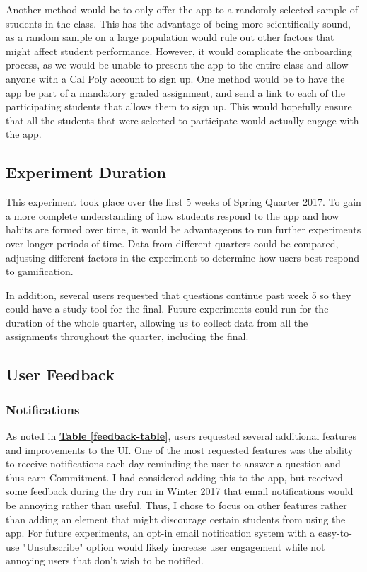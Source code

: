 \par Another method would be to only offer the app to a randomly selected sample of students in the class. This has the advantage of being more scientifically sound, as a random sample on a large population would rule out other factors that might affect student performance. However, it would complicate the onboarding process, as we would be unable to present the app to the entire class and allow anyone with a Cal Poly account to sign up. One method would be to have the app be part of a mandatory graded assignment, and send a link to each of the participating students that allows them to sign up. This would hopefully ensure that all the students that were selected to participate would actually engage with the app.

\subsection{Experiment Duration}

\par This experiment took place over the first 5 weeks of Spring Quarter 2017. To gain a more complete understanding of how students respond to the app and how habits are formed over time, it would be advantageous to run further experiments over longer periods of time. Data from different quarters could be compared, adjusting different factors in the experiment to determine how users best respond to gamification. 

\par In addition, several users requested that questions continue past week 5 so they could have a study tool for the final. Future experiments could run for the duration of the whole quarter, allowing us to collect data from all the assignments throughout the quarter, including the final.

\subsection{User Feedback}

\subsubsection{Notifications}

\par As noted in \textbf{\hyperref[feedback-table]{Table \ref*{feedback-table}}}, users requested several additional features and improvements to the UI. One of the most requested features was the ability to receive notifications each day reminding the user to answer a question and thus earn Commitment. I had considered adding this to the app, but received some feedback during the dry run in Winter 2017 that email notifications would be annoying rather than useful. Thus, I chose to focus on other features rather than adding an element that might discourage certain students from using the app. For future experiments, an opt-in email notification system with a easy-to-use "Unsubscribe" option would likely increase user engagement while not annoying users that don't wish to be notified.

